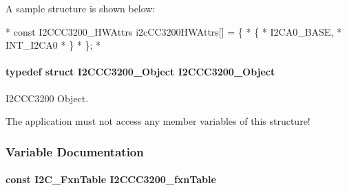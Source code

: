 A sample structure is shown below\-: 
\begin{DoxyCode}
*  \textcolor{keyword}{const} I2CCC3200_HWAttrs i2cCC3200HWAttrs[] = \{
*      \{
*          I2CA0\_BASE,
*          INT\_I2CA0
*      \}
*  \};
*  
\end{DoxyCode}
\paragraph[{I2\-C\-C\-C3200\-\_\-\-Object}]{\setlength{\rightskip}{0pt plus 5cm}typedef struct {\bf I2\-C\-C\-C3200\-\_\-\-Object}  {\bf I2\-C\-C\-C3200\-\_\-\-Object}}\label{_i2_c_c_c3200_8h_aa8410656ed73821e36a81fd1e4c083a8}


I2\-C\-C\-C3200 Object. 

The application must not access any member variables of this structure! 

\subsubsection{Variable Documentation}
\paragraph[{I2\-C\-C\-C3200\-\_\-fxn\-Table}]{\setlength{\rightskip}{0pt plus 5cm}const {\bf I2\-C\-\_\-\-Fxn\-Table} I2\-C\-C\-C3200\-\_\-fxn\-Table}\label{_i2_c_c_c3200_8h_a8d55c316465052f05df19d16002be53a}
